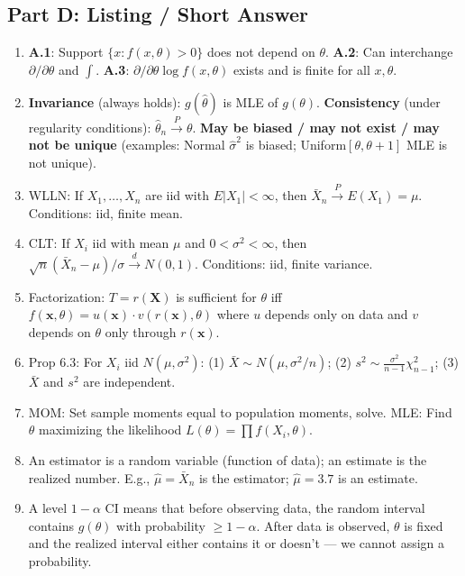 \documentclass[11pt]{article}
\begin{document}
\subsection*{Part D: Listing / Short Answer}
\begin{enumerate}[start=32]
\item \textbf{A.1}: Support $\{x: f(x,\theta)>0\}$ does not depend on $\theta$. \textbf{A.2}: Can interchange $\partial/\partial\theta$ and $\int$. \textbf{A.3}: $\partial/\partial\theta \log f(x,\theta)$ exists and is finite for all $x, \theta$.

\item \textbf{Invariance} (always holds): $g(\hat\theta)$ is MLE of $g(\theta)$. \textbf{Consistency} (under regularity conditions): $\hat\theta_n \xrightarrow{P} \theta$. \textbf{May be biased / may not exist / may not be unique} (examples: Normal $\hat\sigma^2$ is biased; Uniform$[\theta,\theta+1]$ MLE is not unique).

\item WLLN: If $X_1,\ldots,X_n$ are iid with $E|X_1| < \infty$, then $\bar X_n \xrightarrow{P} E(X_1) = \mu$. Conditions: iid, finite mean.

\item CLT: If $X_i$ iid with mean $\mu$ and $0 < \sigma^2 < \infty$, then $\sqrt{n}(\bar X_n - \mu)/\sigma \xrightarrow{d} N(0,1)$. Conditions: iid, finite variance.

\item Factorization: $T = r(\mathbf{X})$ is sufficient for $\theta$ iff $f(\mathbf{x},\theta) = u(\mathbf{x}) \cdot v(r(\mathbf{x}), \theta)$ where $u$ depends only on data and $v$ depends on $\theta$ only through $r(\mathbf{x})$.

\item Prop 6.3: For $X_i$ iid $N(\mu,\sigma^2)$: (1) $\bar X \sim N(\mu, \sigma^2/n)$; (2) $s^2 \sim \frac{\sigma^2}{n-1}\chi^2_{n-1}$; (3) $\bar X$ and $s^2$ are independent.

\item MOM: Set sample moments equal to population moments, solve. MLE: Find $\theta$ maximizing the likelihood $L(\theta) = \prod f(X_i, \theta)$.

\item An estimator is a random variable (function of data); an estimate is the realized number. E.g., $\hat\mu = \bar X_n$ is the estimator; $\hat\mu = 3.7$ is an estimate.

\item A level $1{-}\alpha$ CI means that before observing data, the random interval contains $g(\theta)$ with probability $\ge 1{-}\alpha$. After data is observed, $\theta$ is fixed and the realized interval either contains it or doesn't --- we cannot assign a probability.
\end{enumerate}
\end{document}
